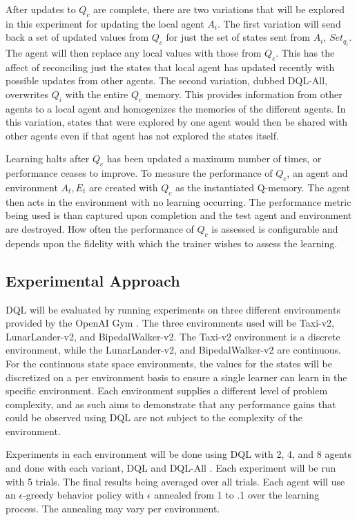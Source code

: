 \documentclass[jair,twoside,11pt,theapa]{article}
\begin{document}
After updates to $Q_c$ are complete, there are two variations that will be explored in this experiment for updating the local agent $A_i$. 
The first variation will send back a set of updated values from $Q_c$ for just the set of states sent from $A_i$, $Set_{q_i}$. The agent will 
then replace any local values with those from $Q_c$. This has the affect of reconciling just the states that local agent has updated recently 
with possible updates from other agents. 
The second variation, dubbed DQL-All, overwrites $Q_i$ with the entire $Q_c$ memory. This provides information from other agents to a local agent and homogenizes 
the memories of the different agents. In this variation, states that were explored by one agent would then be shared with other agents even if that 
agent has not explored the states itself. 

Learning halts after $Q_c$ has been updated a maximum number of times, or performance ceases to improve. To measure the performance of $Q_c$, an agent 
and environment $A_t, E_t$ are created with $Q_c$ as the instantiated Q-memory. The agent then acts in the environment with no learning occurring. 
The performance metric being used is than captured upon completion and the test agent and environment are destroyed. How often the performance of $Q_c$ 
is assessed is configurable and depends upon the fidelity with which the trainer wishes to assess the learning. 


\subsection{Experimental Approach}
\label{experiments}
DQL will be evaluated by running experiments on three different environments provided by the OpenAI Gym \cite{gym}.
The three environments used will be Taxi-v2, LunarLander-v2, and BipedalWalker-v2. The Taxi-v2 environment is a discrete 
environment, while the LunarLander-v2, and BipedalWalker-v2 are continuous. For the continuous state space environments, 
the values for the states will be discretized on a per environment basis to ensure a single learner can learn in the specific environment. 
Each environment supplies a different level of problem complexity, and as such aims to demonstrate that any performance gains that could
be observed using DQL are not subject to the complexity of the environment.

Experiments in each environment will be done using DQL with 2, 4, and 8 agents and done with each variant, DQL and DQL-All . Each experiment will be run with 5 trials. The final results
being averaged over all trials. Each agent will use an $\epsilon$-greedy behavior policy with $\epsilon$ annealed from 1 to .1 over the learning process. The annealing may vary per environment. 
\end{document}
